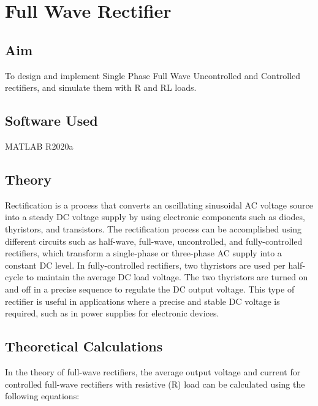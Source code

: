 \chapter{Full Wave Rectifier}
\vspace{-1cm}

\section{Aim}
\hspace{1cm}To design and implement Single Phase Full Wave Uncontrolled and Controlled rectifiers, and
simulate them with R and RL loads.

\section{Software Used}
\hspace{1cm}MATLAB R2020a
\section{Theory}
\hspace{\parindent}

Rectification is a process that converts an oscillating sinusoidal AC voltage source into a steady DC voltage supply by using electronic components such as diodes, thyristors, and transistors. The rectification process can be accomplished using different circuits such as half-wave, full-wave, uncontrolled, and fully-controlled rectifiers, which transform a single-phase or three-phase AC supply into a constant DC level. In fully-controlled rectifiers, two thyristors are used per half-cycle to maintain the average DC load voltage. The two thyristors are turned on and off in a precise sequence to regulate the DC output voltage. This type of rectifier is useful in applications where a precise and stable DC voltage is required, such as in power supplies for electronic devices.


\section{Theoretical Calculations}
\hspace{\parindent}
In the theory of full-wave rectifiers, the average output voltage and current for controlled full-wave rectifiers with resistive (R) load can be calculated using the following equations:

